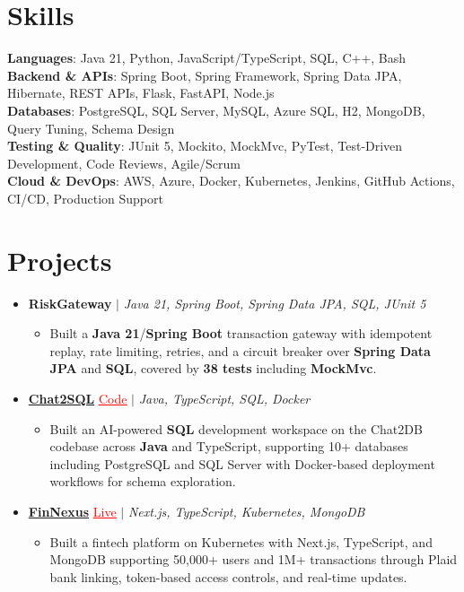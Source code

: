 \documentclass[letterpaper,10pt]{article}
\newcommand{\itemTail}{\vspace{-4pt}}
\newcommand{\sectionGap}{\vspace{-8pt}}
\newcommand{\projGap}{\vspace{3pt}}
\newcommand{\resumeItem}[1]{\item\small{{#1 \itemTail}}}
\newcommand{\resumeProjectHeading}[1]{\item \small #1 \vspace{-2pt}}
\newcommand{\resumeProjectLink}[2]{\href{#1}{\textcolor{red}{\underline{#2}}}}
\newcommand{\resumeSubHeadingListStart}{\begin{itemize}[leftmargin=0.0in, label={}]}
\newcommand{\resumeSubHeadingListEnd}{\end{itemize}}
\newcommand{\resumeProjItemListStart}{\begin{itemize}[leftmargin=0.15in,label=\textbullet,itemsep=3pt,topsep=0pt,parsep=0pt,partopsep=0pt]}
\newcommand{\resumeProjItemListEnd}{\end{itemize}\vspace{-4pt}}
\begin{document}
\section{Skills}
\begin{itemize}[leftmargin=0.15in, label={}]
\small{\item{
\textbf{Languages}: Java 21, Python, JavaScript/TypeScript, SQL, C++, Bash \\
\textbf{Backend \& APIs}: Spring Boot, Spring Framework, Spring Data JPA, Hibernate, REST APIs, Flask, FastAPI, Node.js \\
\textbf{Databases}: PostgreSQL, SQL Server, MySQL, Azure SQL, H2, MongoDB, Query Tuning, Schema Design \\
\textbf{Testing \& Quality}: JUnit 5, Mockito, MockMvc, PyTest, Test-Driven Development, Code Reviews, Agile/Scrum \\
\textbf{Cloud \& DevOps}: AWS, Azure, Docker, Kubernetes, Jenkins, GitHub Actions, CI/CD, Production Support
}}
\end{itemize}
\sectionGap
\section{Projects}
\resumeSubHeadingListStart
\vspace{-2pt}
\resumeProjectHeading{\textbf{RiskGateway} $|$ \emph{Java 21, Spring Boot, Spring Data JPA, SQL, JUnit 5}}
\resumeProjItemListStart
\resumeItem{Built a \textbf{Java 21}/\textbf{Spring Boot} transaction gateway with idempotent replay, rate limiting, retries, and a circuit breaker over \textbf{Spring Data JPA} and \textbf{SQL}, covered by \textbf{38 tests} including \textbf{MockMvc}.}
\resumeProjItemListEnd
\projGap
\resumeProjectHeading{\href{https://github.com/SAHAJ-BHADJA/Chat2SQL}{\textbf{Chat2SQL}} {\resumeProjectLink{https://github.com/SAHAJ-BHADJA/Chat2SQL}{Code}} $|$ \emph{Java, TypeScript, SQL, Docker}}
\resumeProjItemListStart
\resumeItem{Built an AI-powered \textbf{SQL} development workspace on the Chat2DB codebase across \textbf{Java} and TypeScript, supporting 10+ databases including PostgreSQL and SQL Server with Docker-based deployment workflows for schema exploration.}
\resumeProjItemListEnd
\projGap
\resumeProjectHeading{\href{https://fin-nexus.vercel.app/}{\textbf{FinNexus}} {\resumeProjectLink{https://fin-nexus.vercel.app/}{Live}} $|$ \emph{Next.js, TypeScript, Kubernetes, MongoDB}}
\resumeProjItemListStart
\resumeItem{Built a fintech platform on Kubernetes with Next.js, TypeScript, and MongoDB supporting 50,000+ users and 1M+ transactions through Plaid bank linking, token-based access controls, and real-time updates.}
\resumeProjItemListEnd
\resumeSubHeadingListEnd
\end{document}
